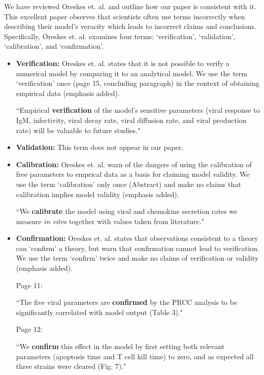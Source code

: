 \documentclass[10pt]{article}
\newenvironment{response}{\fontfamily{cmr}}{\par}
\begin{document}
\begin{enumerate}
\begin{response}
We have reviewed Oreskes et. al.  and outline how our paper is
consistent with it.  This excellent paper observes that scientists often use terms incorrectly when describing their model's veracity which leads to incorrect claims and conclusions.  Specifically, Oreskes et. al. examines four terms: `verification', `validation', `calibration', and `confirmation'.
\begin{itemize}
\item \textbf{Verification:} Oreskes et. al. states that it is not
  possible to verify a numerical model by comparing it to an
  analytical model.  We use the term `verification' once (page 15, concluding paragraph) in the context of obtaining empirical data (emphasis added).
\begin{displayquote}
``Empirical \textbf{verification} of the model's sensitive parameters (viral response to IgM, infectivity, viral decay rate, viral diffusion rate, and viral production rate) will be valuable to future studies."
\end{displayquote}
\item \textbf{Validation:} This term does not appear in our paper.
\item \textbf{Calibration:} Oreskes et. al. warn of the dangers of
  using the calibration of free parameters to emprical data as a basis
  for claiming model validity.  We use the term `calibration' only
  once (Abstract) and make no claims that calibration implies model validity (emphasis added).
\begin{displayquote}
``We \textbf{calibrate} the model using viral and chemokine secretion rates we measure \textit{in vitro} together with values taken from literature."
\end{displayquote}
\item \textbf{Confirmation:} Oreskes et. al. states that observations consistent to a theory can `confirm' a theory, but warn that confirmation cannot lead to verification.  We use the term `confirm' twice and make no claims of verification or validity (emphasis added).

Page 11:
\begin{displayquote}
``The  five viral parameters are \textbf{confirmed} by the PRCC analysis to be significantly correlated with model output (Table 3)."
\end{displayquote}

Page 12:
\begin{displayquote}
``We \textbf{confirm} this effect in the model by first setting both relevant parameters (apoptosis time and T cell kill time) to zero, and as expected all three strains were cleared (Fig. 7)."
\end{displayquote}



\end{itemize}
\end{response}
\end{enumerate}
\end{document}
